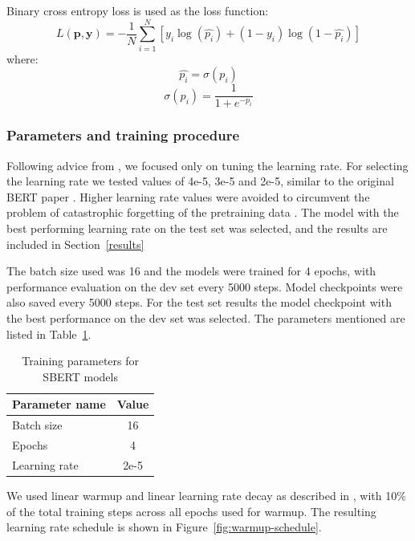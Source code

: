 \documentclass[10pt, a4paper]{article}
\begin{document}
Binary cross entropy loss is used as the loss function:
$$
L(\mathbf{p}, \mathbf{y}) = -\frac{1}{N} \sum_{i=1}^{N} \left[ y_i \log \left( \hat{p_i} \right) + (1 - y_i) \log \left( 1 - \hat{p_i} \right) \right]
$$
where:
$$
\hat{p_i} = \sigma(p_i)
$$
$$
\sigma(p_i) = \frac{1}{1 + e^{-p_i}}
$$

\subsubsection{Parameters and training procedure}

Following advice from \citet{gkouti2024should}, we focused only on tuning the learning rate. For selecting the learning rate we tested values of 4e-5, 3e-5 and 2e-5, similar to the original BERT paper \cite{devlin2018bert}.
Higher learning rate values were avoided to circumvent the problem of catastrophic forgetting of the pretraining data \citep{sun2019fine}.
The model with the best performing learning rate on the test set was selected, and the results are included in Section~\ref{results}

The batch size used was 16 and the models were trained for 4 epochs, with performance evaluation on the dev set every 5000 steps. Model checkpoints were also saved every 5000 steps.
For the test set results the model checkpoint with the best performance on the dev set was selected. The parameters mentioned are listed in Table~\ref{tab:train-params}.

\begin{table}
\caption{Training parameters for SBERT models}
\label{tab:train-params}
\begin{center}
\begin{tabular}{lc}
\toprule
\textbf{Parameter name} & \textbf{Value} \\
\midrule
Batch size   & 16 \\
Epochs  & 4 \\
Learning rate & 2e-5 \\
\bottomrule
\end{tabular}
\end{center}
\end{table}

We used linear warmup and linear learning rate decay as described in \citet{devlin2018bert}, with 10\% of the total training steps across all epochs used for warmup.
The resulting learning rate schedule is shown in Figure~\ref{fig:warmup-schedule}.
\end{document}
